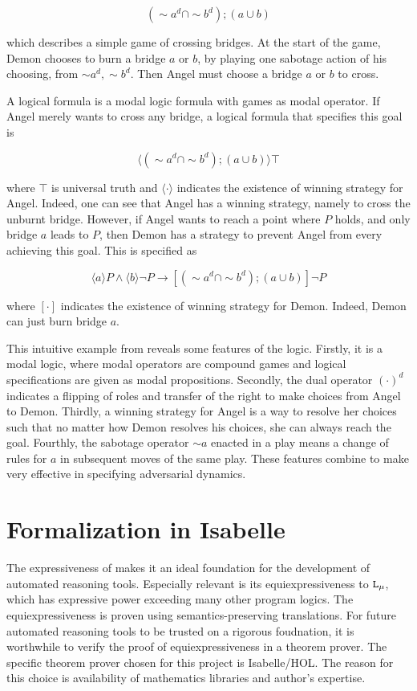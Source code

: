\[ (\sim a^d \cap \sim b^d) ; (a\cup b) \]

which describes a simple game of crossing bridges. At the start of the game, Demon chooses to burn a bridge $a$ or $b$, by playing one sabotage action of his choosing, from $\sim a^d, \sim b^d$. Then Angel must choose a bridge $a$ or $b$ to cross. 

A \GLs{} logical formula is a modal logic formula with games as modal operator. If Angel merely wants to cross any bridge, a \GLs{} logical formula that specifies this goal is 

\[\langle(\sim a^d \cap \sim b^d) ; (a\cup b)\rangle \top\]

where $\top$ is universal truth and $\langle\cdot\rangle$ indicates the existence of winning strategy for Angel. Indeed, one can see that Angel has a winning strategy, namely to cross the unburnt bridge. However, if Angel wants to reach a point where $P$ holds, and only bridge $a$ leads to $P$, then Demon has a strategy to prevent Angel from every achieving this goal. This is specified as

\[\langle a\rangle P \wedge \langle b\rangle\neg P \rightarrow [(\sim a^d \cap \sim b^d) ; (a\cup b)] \neg P\]

where $[\cdot]$ indicates the existence of winning strategy for Demon. Indeed, Demon can just burn bridge $a$.

This intuitive example from \GLs{} reveals some features of the logic. Firstly, it is a modal logic, where modal operators are compound games and logical specifications are given as modal propositions. Secondly, the dual operator $(\cdot)^d$ indicates a flipping of roles and transfer of the right to make choices from Angel to Demon. Thirdly, a winning strategy for Angel is a way to resolve her choices such that no matter how Demon resolves his choices, she can always reach the goal. Fourthly, the sabotage operator $\sim a$ enacted in a play means a change of rules for $a$ in subsequent moves of the same play. These features combine to make \GLs{} very effective in specifying adversarial dynamics.

\section{Formalization in Isabelle}
The expressiveness of \GLs{} makes it an ideal foundation for the development of automated reasoning tools. Especially relevant is its equiexpressiveness to $\texttt{L}_\mu{}$, which has expressive power exceeding many other program logics. The equiexpressiveness is proven using semantics-preserving translations. For future automated reasoning tools to be trusted on a rigorous foudnation, it is worthwhile to verify the proof of equiexpressiveness in a theorem prover. The specific theorem prover chosen for this project is Isabelle/HOL. The reason for this choice is availability of mathematics libraries and author's expertise.

